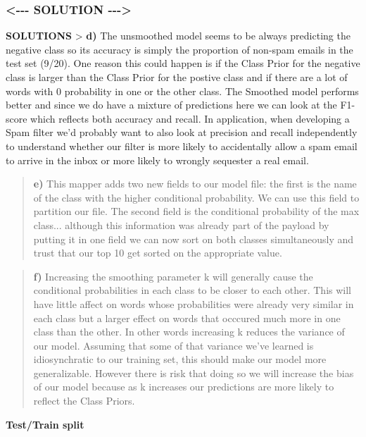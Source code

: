 \documentclass[11pt]{article}
\begin{document}
    \subsubsection{\textless{}-\/-\/- SOLUTION
-\/-\/-\textgreater{}}\label{solution----}

\textbf{SOLUTIONS} \textgreater{} \textbf{d)} The unsmoothed model seems
to be always predicting the negative class so its accuracy is simply the
proportion of non-spam emails in the test set (9/20). One reason this
could happen is if the Class Prior for the negative class is larger than
the Class Prior for the postive class and if there are a lot of words
with 0 probability in one or the other class. The Smoothed model
performs better and since we do have a mixture of predictions here we
can look at the F1-score which reflects both accuracy and recall. In
application, when developing a Spam filter we'd probably want to also
look at precision and recall independently to understand whether our
filter is more likely to accidentally allow a spam email to arrive in
the inbox or more likely to wrongly sequester a real email.

\begin{quote}
\textbf{e)} This mapper adds two new fields to our model file: the first
is the name of the class with the higher conditional probability. We can
use this field to partition our file. The second field is the
conditional probability of the max class... although this information
was already part of the payload by putting it in one field we can now
sort on both classes simultaneously and trust that our top 10 get sorted
on the appropriate value.
\end{quote}

\begin{quote}
\textbf{f)} Increasing the smoothing parameter k will generally cause
the conditional probabilities in each class to be closer to each other.
This will have little affect on words whose probabilities were already
very similar in each class but a larger effect on words that occcured
much more in one class than the other. In other words increasing k
reduces the variance of our model. Assuming that some of that variance
we've learned is idiosynchratic to our training set, this should make
our model more generalizable. However there is risk that doing so we
will increase the bias of our model because as k increases our
predictions are more likely to reflect the Class Priors.
\end{quote}

    \textbf{Test/Train split}
\end{document}
